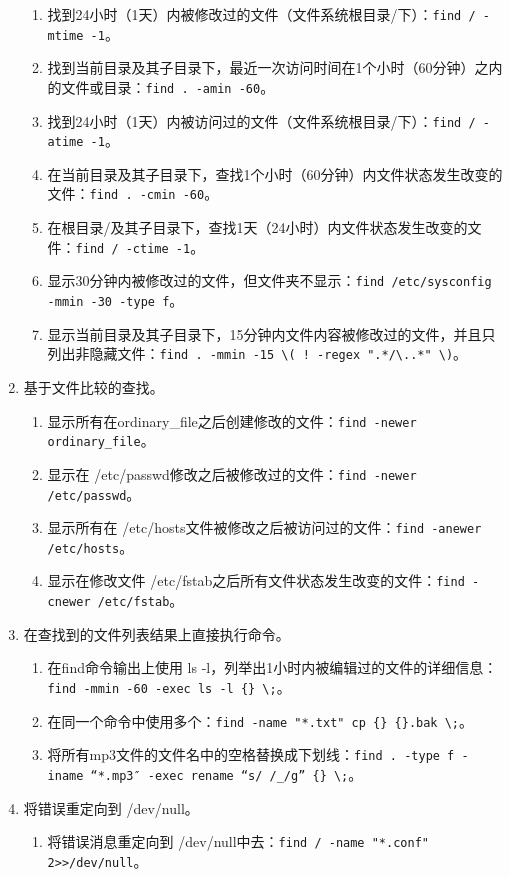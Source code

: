 \begin{enumerate}
\begin{enumerate}
      \item 找到24小时（1天）内被修改过的文件（文件系统根目录/下）：\verb|find / -mtime -1|。
      \item 找到当前目录及其子目录下，最近一次访问时间在1个小时（60分钟）之内的文件或目录：\verb|find . -amin -60|。
      \item 找到24小时（1天）内被访问过的文件（文件系统根目录/下）：\verb|find / -atime -1|。
      \item 在当前目录及其子目录下，查找1个小时（60分钟）内文件状态发生改变的文件：\verb|find . -cmin -60|。
      \item 在根目录/及其子目录下，查找1天（24小时）内文件状态发生改变的文件：\verb|find / -ctime -1|。
      \item 显示30分钟内被修改过的文件，但文件夹不显示：\verb|find /etc/sysconfig -mmin -30 -type f|。
      \item 显示当前目录及其子目录下，15分钟内文件内容被修改过的文件，并且只列出非隐藏文件：\verb|find . -mmin -15 \( ! -regex ".*/\..*" \)|。
    \end{enumerate}
  \item 基于文件比较的查找。
    \begin{enumerate}
      \item 显示所有在ordinary\_file之后创建修改的文件：\verb|find -newer ordinary_file|。
      \item 显示在 /etc/passwd修改之后被修改过的文件：\verb|find -newer /etc/passwd|。
      \item 显示所有在 /etc/hosts文件被修改之后被访问过的文件：\verb|find -anewer /etc/hosts|。
      \item 显示在修改文件 /etc/fstab之后所有文件状态发生改变的文件：\verb|find -cnewer /etc/fstab|。
    \end{enumerate}
  \item 在查找到的文件列表结果上直接执行命令。
    \begin{enumerate}
      \item 在find命令输出上使用 ls -l，列举出1小时内被编辑过的文件的详细信息：\verb|find -mmin -60 -exec ls -l {} \;|。
      \item 在同一个命令中使用多个{}：\verb|find -name "*.txt" cp {} {}.bak \;|。
      \item 将所有mp3文件的文件名中的空格替换成下划线：\verb|find . -type f -iname “*.mp3″ -exec rename “s/ /_/g” {} \;|。
    \end{enumerate}
  \item 将错误重定向到 /dev/null。
    \begin{enumerate}
      \item 将错误消息重定向到 /dev/null中去：\verb|find / -name "*.conf" 2>>/dev/null|。
    \end{enumerate}
\end{enumerate}

